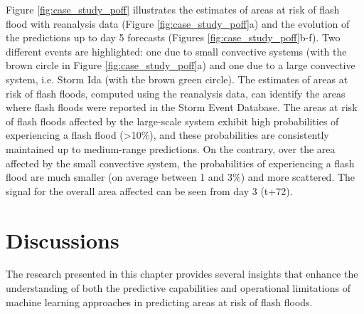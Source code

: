Figure \ref{fig:case_study_poff} illustrates the estimates of areas at risk of flash flood with reanalysis data (Figure \ref{fig:case_study_poff}a) and the evolution of the predictions up to day 5 forecasts (Figures \ref{fig:case_study_poff}b-f). Two different events are highlighted: one due to small convective systems (with the brown circle in Figure \ref{fig:case_study_poff}a) and one due to a large convective system, i.e. Storm Ida (with the brown green circle). The estimates of areas at risk of flash floods, computed using the reanalysis data, can identify the areas where flash floods were reported in the Storm Event Database. The areas at risk of flash floods affected by the large-scale system exhibit high probabilities of experiencing a flash flood (>10\%), and these probabilities are consistently maintained up to medium-range predictions. On the contrary, over the area affected by the small convective system, the probabilities of experiencing a flash flood are much smaller (on average between 1 and 3\%) and more scattered. The signal for the overall area affected can be seen from day 3 (t+72).

\section{Discussions}
\label{data_driven_flash_floods_short_medium_range_discussions}

The research presented in this chapter provides several insights that enhance the understanding of both the predictive capabilities and operational limitations of machine learning approaches in predicting areas at risk of flash floods. 

